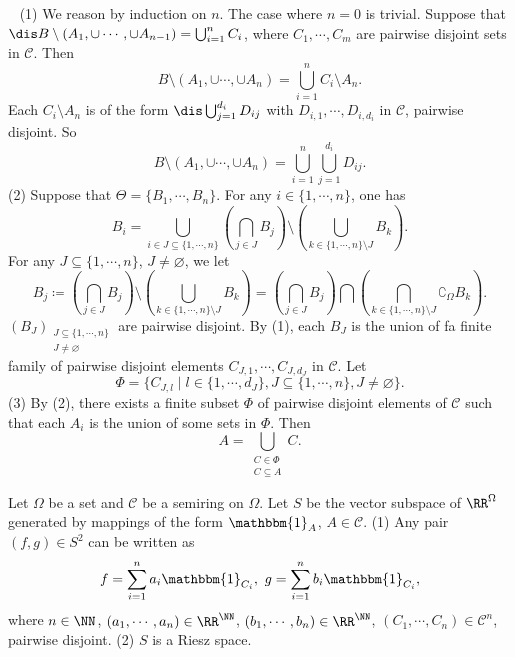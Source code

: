\begin{proofenv}
    \ \newline
    (1) We reason by induction on $n$. The case where $n=0$ is trivial.
    Suppose that $\dis B\setminus(A_1,\cup\cdots,\cup A_{n-1})=\bigcup_{i=1}^{n}C_i$, where $C_1,\cdots,C_m$ are pairwise disjoint sets in $\mathcal{C}$. Then 
    $$B\setminus(A_1,\cup\cdots,\cup A_{n})=\bigcup_{i=1}^{n}C_i\setminus A_n.$$
    Each $C_i\setminus A_n$ is of the form $\dis \bigcup_{j=1}^{d_i}D_{ij}$ with $D_{i,1},\cdots,D_{i,d_i}$  in $\mathcal{C}$, pairwise disjoint. So
    $$ B\setminus(A_1,\cup\cdots,\cup A_{n})=\bigcup_{i=1}^{n}\bigcup_{j=1}^{d_i}D_{ij}.$$
    \newline
    (2) Suppose that $\Theta=\{B_1,\cdots,B_n\}$. For any $i\in \{1,\cdots,n\}$, one has
    $$ B_i=\bigcup_{i\in J\subseteq\{1,\cdots,n\}}\left(\bigcap_{j\in J}B_j\right)\setminus\left(\bigcup_{k\in \{1,\cdots,n\}\setminus J} B_k\right).$$
    For any $J\subseteq\{1,\cdots,n\}$, $J\neq \varnothing$, we let
    $$ B_j\coloneq \left(\bigcap_{j\in J}B_j\right)\setminus \left(\bigcup_{k\in\{1,\cdots,n\}\setminus J}B_k\right)= \left(\bigcap_{j\in J}B_j\right)\bigcap \left(\bigcap_{k\in \{1,\cdots,n\}\setminus J} \complement_\Omega B_k\right).$$
    $ \left(B_J\right)_{\substack{J\subseteq \{1,\cdots,n\}\\ J\neq \varnothing}}$ are pairwise disjoint. By (1), each $B_J$ is the union of fa finite family of pairwise disjoint elements $C_{J,1},\cdots,C_{J,d_J}$ in $\mathcal{C}$. Let 
    $$\Phi=\{C_{J,l}\mid  l\in \{1,\cdots,d_J\}, J\subseteq \{1,\cdots,n\}, J\neq\varnothing\}.$$
    (3) By (2), there exists a finite subset $\Phi$ of pairwise disjoint elements of $\mathcal{C}$ such that each $A_i$ is the union of some sets in $\Phi$. Then 
    $$A=\bigcup_{\substack{C\in \Phi\\C\subseteq A}}C.$$
\end{proofenv}
\begin{propositionenv}
    Let $\Omega$ be a set and $\mathcal{C}$ be a semiring on $\Omega$. Let $S$ be the vector subspace of $\RR^\Omega$ generated by mappings of the form $\mathbbm{1}_A$, $A\in \mathcal{C}$.
    \newline
    (1) Any pair $(f,g)\in S^2$ can be written as 
    $$ f=\sum_{i=1}^{n}a_i\mathbbm{1}_{C_i},\ g=\sum_{i=1}^{n}b_i\mathbbm{1}_{C_i},$$
    where $n\in\NN$, $(a_1,\cdots,a_n)\in \RR^\NN$, $(b_1,\cdots,b_n)\in \RR^\NN$, $(C_1,\cdots,C_n)\in \mathcal{C}^n$, pairwise disjoint.
    \newline
    (2) $S$ is a Riesz space.
\end{propositionenv}
